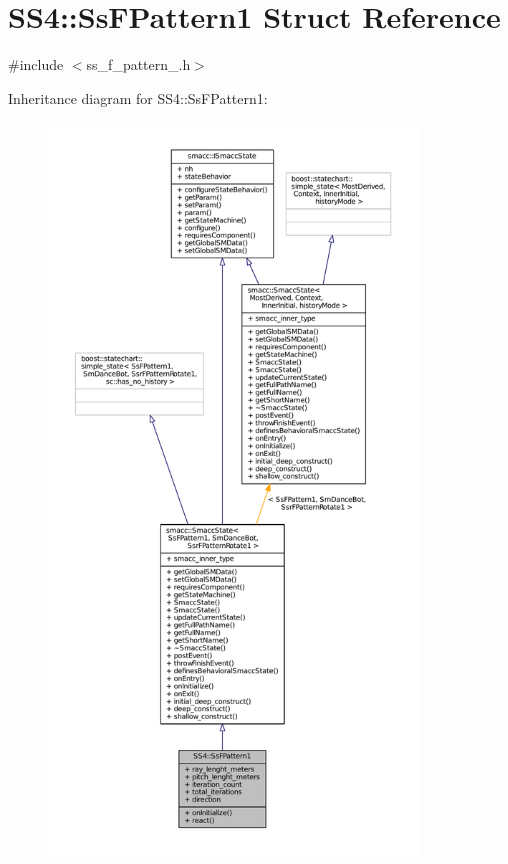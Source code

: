 \hypertarget{structSS4_1_1SsFPattern1}{}\section{S\+S4\+:\+:Ss\+F\+Pattern1 Struct Reference}
\label{structSS4_1_1SsFPattern1}


{\ttfamily \#include $<$ss\+\_\+f\+\_\+pattern\+\_.\+h$>$}



Inheritance diagram for S\+S4\+:\+:Ss\+F\+Pattern1\+:
\nopagebreak
\begin{figure}[H]
\begin{center}
\leavevmode
\includegraphics[height=550pt]{structSS4_1_1SsFPattern1__inherit__graph}
\end{center}
\end{figure}



